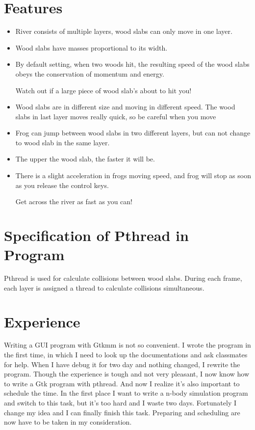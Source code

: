 \documentclass{article}
\begin{document}
\section{Features}
	\large
	\begin{itemize}
		\item
			River consists of multiple layers, wood slabs can only move in one layer.
		\item
			Wood slabs have masses proportional to its width.

		\item
			By default setting, when two woods hit, the resulting speed of
			the wood slabs obeys the conservation of momentum and energy.

			Watch out if a large piece of wood slab's about to hit you!
		\item
			Wood slabs are in different size and moving in different speed.
			The wood slabs in last layer moves really quick, so be careful
			when you move
		\item
			Frog can jump between wood slabs in two different layers, but
			can not change to wood slab in the same layer.
		\item
			The upper the wood slab, the faster it will be.
		\item
			There is a slight acceleration in frogs moving speed, and frog
			will stop as soon as you release the control keys.

			Get across the river as fast as you can!
	\end{itemize}

\section{Specification of Pthread in Program}
	Pthread is used for calculate collisions between wood slabs.
	During each frame, each layer is assigned a thread to calculate
	collisions simultaneous.

\section{Experience}
	Writing a GUI program with Gtkmm is not so convenient. I wrote the program in the first
	time, in which I need to look up the documentations and ask classmates for help. When
	I have debug it for two day and nothing changed, I rewrite the program. Though the
	experience is tough and not very pleasant, I now know how to write a Gtk program with
	pthread. And now I realize it's also important to schedule the time. In the first place
	I want to write a n-body simulation program and switch to this task, but it's too hard
	and I waste two days. Fortunately I change my idea and I can finally finish this task.
	Preparing and scheduling are now have to be taken in my consideration.
\end{document}
